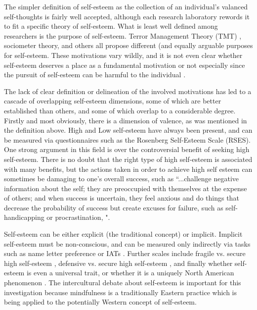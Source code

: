 \documentclass[jou]{apa}
\begin{document}
The simpler definition of self-esteem as the collection of an individual's valanced self-thoughts is fairly well accepted, although each research laboratory rewords it to fit a specific theory of self-esteem.  What is least well defined among researchers is the purpose of self-esteem.  Terror Management Theory (TMT) \cite{greenberg2008}, sociometer theory,  \cite{leary1995} and others \cite{crocker2004} all propose different (and equally arguable purposes for self-esteem.  These motivations vary wildly, and it is not even clear whether self-esteem deserves a place as a fundamental motivation or not \cite{ryan2003} especially since the pursuit of self-esteem can be harmful to the individual \cite{crocker2004}. 

The lack of clear definition or delineation of the involved motivations has led to a cascade of overlapping self-esteem dimensions, some of which are better established than others, and some of which overlap to a considerable degree.  Firstly and most obviously, there is a dimension of valence, as was mentioned in the definition above.  High and Low self-esteem have always been present, and can be measured via questionnaires such as the Rosenberg Self-Esteem Scale (RSES).  One strong argument in this field is over the controversial benefit of seeking high self-esteem.  There is no doubt that the right type of high self-esteem is associated with many benefits, but the actions taken in order to achieve high self esteem can sometimes be damaging to one's overall success, such as ``...challenge negative information about the self; they are preoccupied with themselves at the expense of others; and when success is uncertain, they feel anxious and do things that decrease the probability of success but create excuses for failure, such as self-handicapping or procrastination, \cite{crocker2004a, pyszczynski2004}".  

Self-esteem can be either explicit (the traditional concept) or implicit.  Implicit self-esteem must be non-conscious, and can be measured only indirectly via tasks such as name letter preference or IATs \cite{bosson2006, jordan2006, koole2001}.  Further scales include fragile vs. secure high self-esteem \cite{kernis2010}, defensive vs. secure high self-esteem \cite{jordan2003}, and finally whether self-esteem is even a universal trait, or whether it is a uniquely North American phenomenon \cite{markus2003, heine1999, sedikides2003, heine2005}.  The intercultural debate about self-esteem is important for this investigation because mindfulness is a traditionally Eastern practice which is being applied to the potentially Western concept of self-esteem.  
\end{document}
